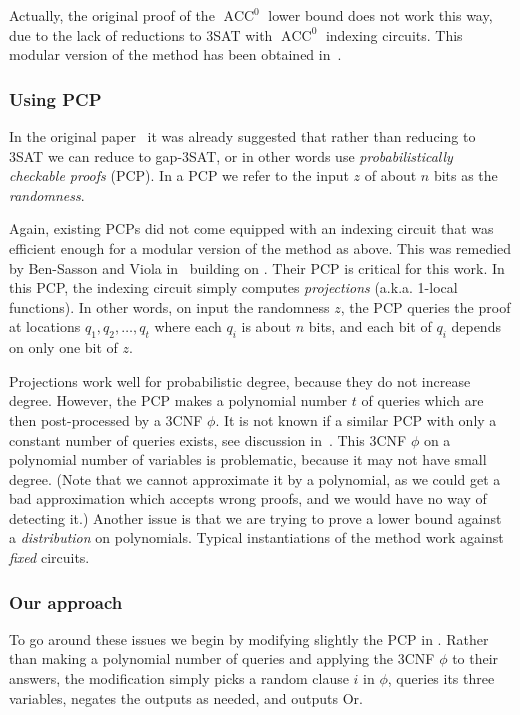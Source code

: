 \documentclass{toc}
\DeclareMathOperator{\ACC}{\mathrm{ACC}}  %
\begin{document}
Actually, the original proof of the $\ACC^{0}$ lower bound does not
work this way, due to the lack of reductions to 3SAT with $\ACC^{0}$
indexing circuits. This modular version of the method has been obtained
in~\cite{JahanjouMV-explicit}.

\subsubsection{Using PCP}

In the original paper~\cite{Williams13-Improving} it was already
suggested that rather than reducing to 3SAT we can reduce to gap-3SAT,
or in other words use \emph{probabilistically checkable proofs} (PCP).
In a PCP we refer to the input $z$ of about $n$ bits as the \emph{randomness}.

Again, existing PCPs did not come equipped with an indexing circuit
that was efficient enough for a modular version of the method as above.
This was remedied by Ben-Sasson and Viola in~\cite{Ben-SassonV-AC0PCP}
building on \cite{Ben-SassonGHSV05,Ben-SassonS08}. Their PCP is critical
for this work. In this PCP, the indexing circuit simply computes \emph{projections}
(a.k.a. 1-local functions). In other words, on input the randomness
$z$, the PCP queries the proof at locations $q_{1},q_{2},\ldots,q_{t}$
where each $q_{i}$ is about $n$ bits, and each bit of $q_{i}$ depends
on only one bit of $z$.

Projections work well for probabilistic degree, because they do not
increase degree. However, the PCP makes a polynomial number $t$ of
queries which are then post-processed by a 3CNF $\phi$. It is not
known if a similar PCP with only a constant number of queries exists,
see discussion in~\cite{Ben-SassonV-AC0PCP}. This 3CNF $\phi$ on
a polynomial number of variables is problematic, because it may not
have small degree. (Note that we cannot approximate it by a polynomial,
as we could get a bad approximation which accepts wrong proofs, and
we would have no way of detecting it.) Another issue is that we are
trying to prove a lower bound against a \emph{distribution }on polynomials.
Typical instantiations of the method work against \emph{fixed} circuits.

\subsubsection{Our approach}

To go around these issues we begin by modifying slightly the PCP in
\cite{Ben-SassonV-AC0PCP}. Rather than making a polynomial number
of queries and applying the 3CNF $\phi$ to their answers, the modification
simply picks a random clause $i$ in $\phi$, queries its three variables,
negates the outputs as needed, and outputs Or.
\end{document}
